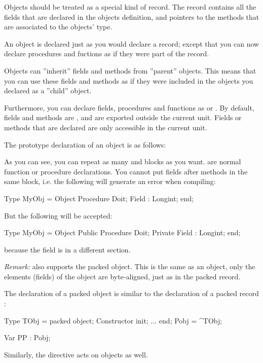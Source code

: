 \documentclass{report}
\begin{document}
Objects should be treated as a special kind of record. The record contains 
all the fields that are declared in the objects definition, and pointers 
to the methods that are associated to the objects' type.

An object is declared just as you would declare a record; except that you
can now declare procedures and fuctions as if they were part of the record.

Objects can ''inherit'' fields and methods from ''parent'' objects. This means
that you can use these fields and methods as if they were included in the
objects you declared as a ''child'' object. 

Furthermore, you can declare fields, procedures and functions as 
or . By default, fields and methods are , and are
exported outside the current unit. Fields or methods that are declared
 are only accessible in the current unit.

The prototype declaration of an object is as follows:



As you can see, you can repeat as many  and  
blocks as you want.
 are normal function or procedure declarations. 
You cannot put fields after methods in the same block, i.e. the following 
will generate an error when compiling:
\begin{listing}
Type MyObj = Object
       Procedure Doit;
       Field : Longint;
     end; 
\end{listing}
But the following will be accepted:
\begin{listing}
Type MyObj = Object
      Public
       Procedure Doit;
      Private
       Field : Longint;
     end; 
\end{listing}
because the field is in a different section.

{\em Remark:}
\fpc also supports the packed object. This is the same as an object, only 
the elements (fields) of the object are byte-aligned, just as in the packed
record.

The declaration of a packed object is similar to the declaration
of a packed record :
\begin{listing}
Type
  TObj = packed object;
   Constructor init;
   ...
   end;
  Pobj = ^TObj;

Var PP : Pobj;
\end{listing}
Similarly, the  directive acts on objects as well.
\end{document}
